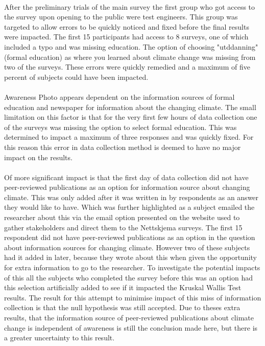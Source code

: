 \paragraph{}
After the preliminary trials of the main survey the first group who got access to the survey upon opening to the public were test engineers. This group was targeted to allow errors to be quickly noticed and fixed before the final results were impacted. The first 15 participants had access to 8 surveys, one of which included a typo and was missing education. The option of choosing "utddanning" (formal education) as where you learned about climate change was missing from two of the surveys. These errors were quickly remedied and a maximum of five percent of subjects could have been impacted. 
\paragraph{}
Awareness Photo appears dependent on the information sources of formal education and newspaper for information about the changing climate. The small limitation on this factor is that for the very first few hours of data collection one of the surveys was missing the option to select formal education. This was determined to impact a maximum of three responses and was quickly fixed. For this reason this error in data collection method is deemed to have no major impact on the results. 
\paragraph{}
Of more significant impact is that the first day of data collection did not have peer-reviewed publications as an option for information source about changing climate. This was only added after it was written in by respondents as an answer they would like to have. Which was further highlighted as a subject emailed the researcher about this via the email option presented on the website used to gather stakeholders and direct them to the Nettskjema surveys.  The first 15 respondent did not have peer-reviewed publications as an option in the question about information sources for changing climate. However two of these subjects had it added in later, because they wrote about this when given the opportunity for extra information to go to the researcher. To investigate the potential impacts of this all the subjects who completed the survey before this was an option had this selection artificially added to see if it impacted the Kruskal Wallis Test results. The result for this attempt to minimise impact of this miss of information collection is that the null hypothesis was still accepted. Due to theses extra results, that the information source of peer-reviewed publications about climate change is independent of awareness is still the conclusion made here, but there is a greater uncertainty to this result.
